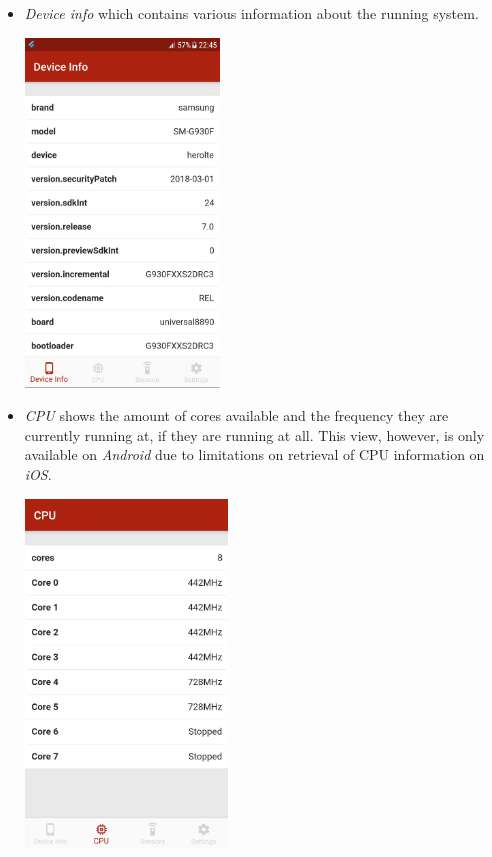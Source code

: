 \documentclass{article}
\begin{document}
  \begin{itemize}
    \item \textit{Device info} which contains various information about the running system.

    \begin{center}
      \includegraphics[height=25em]{mobile-device-info}
    \end{center}

    \item \textit{CPU} shows the amount of cores available and the frequency they are currently running at, if they are running at all. This view, however, is only available on \textit{Android} due to limitations on retrieval of CPU information on \textit{iOS}.

    \begin{center}
      \includegraphics[height=25em]{mobile-cpu}
    \end{center}


\end{itemize}
\end{document}
